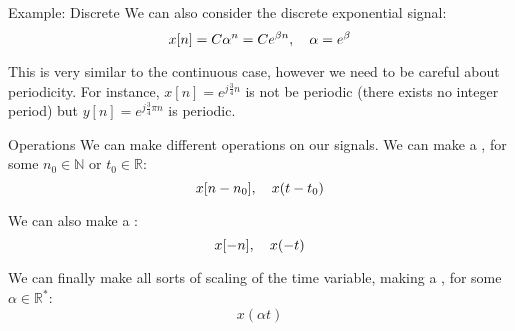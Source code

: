 \documentclass[a4paper]{article}
\begin{document}
\begin{parag}{Example: Discrete}
    We can also consider the discrete exponential signal: 
    \[x\left[n\right] = C \alpha^n = C e^{\beta n}, \mathspace \alpha = e^{\beta}\]

    This is very similar to the continuous case, however we need to be careful about periodicity. For instance, $x\left[n\right] = e^{j \frac{3}{4} n}$ is not be periodic (there exists no integer period) but $y\left[n\right] = e^{j \frac{3}{4} \pi n}$ is periodic. 
\end{parag}

\begin{parag}{Operations}
    We can make different operations on our signals. We can make a , for some $n_0 \in \mathbb{N}$ or $t_0 \in \mathbb{R}$:
    \[x\left[n - n_0\right], \mathspace x\left(t - t_0\right)\]

    We can also make a :
    \[x\left[-n\right], \mathspace x\left(-t\right)\] 

    We can finally make all sorts of scaling of the time variable, making a , for some $\alpha \in \mathbb{R}^*$:
    \[x\left(\alpha t\right)\]
\end{parag}
\end{document}
